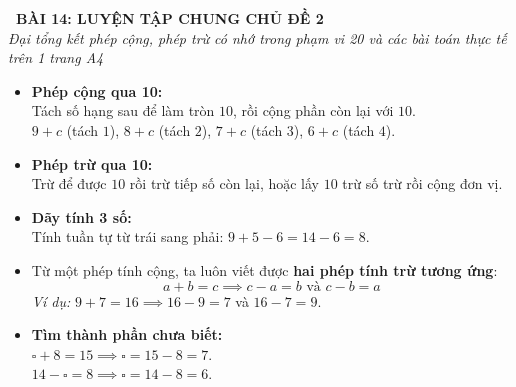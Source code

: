 \documentclass[11pt,a4paper]{article}
\begin{document}
\begin{tcolorbox}[
  enhanced,
  colback=violet!8!white,
  colframe=violet!70!black,
  arc=3mm, boxrule=1.2pt,
  left=3mm, right=3mm, top=2mm, bottom=2mm,
  halign=center
]
  {\LARGE\bfseries\color{violet!90!black}\faBookmark\ BÀI 14: LUYỆN TẬP CHUNG CHỦ ĐỀ 2}\\[1mm]
  {\itshape\footnotesize\color{black!75} Đại tổng kết phép cộng, phép trừ có nhớ trong phạm vi 20 và các bài toán thực tế trên 1 trang A4}
\end{tcolorbox}

\vspace{-2mm}

\noindent
\begin{minipage}[t]{0.49\textwidth}\vspace{0pt}
\begin{tcolorbox}[
  enhanced,
  colback=violet!4!white,
  colframe=violet!75!black,
  arc=2mm, boxrule=0.8pt,
  left=2mm, right=2mm, top=1.8mm, bottom=1.8mm,
  title={\footnotesize\bfseries\color{white}\faKey\ 1. Quy tắc tính nhẩm cốt lõi}
]
{\footnotesize
\begin{itemize}\setlength{\itemsep}{1pt}\setlength{\leftskip}{-2.5mm}
  \item \textbf{Phép cộng qua 10:}\\
  Tách số hạng sau để làm tròn $10$, rồi cộng phần còn lại với $10$.\\
  $9+c$ (tách $1$), $8+c$ (tách $2$), $7+c$ (tách $3$), $6+c$ (tách $4$).
  \item \textbf{Phép trừ qua 10:}\\
  Trừ để được $10$ rồi trừ tiếp số còn lại, hoặc lấy $10$ trừ số trừ rồi cộng đơn vị.
  \item \textbf{Dãy tính 3 số:}\\
  Tính tuần tự từ trái sang phải: $9 + 5 - 6 = 14 - 6 = 8$.
\end{itemize}
}
\end{tcolorbox}
\end{minipage}
\hfill
\begin{minipage}[t]{0.49\textwidth}\vspace{0pt}
\begin{tcolorbox}[
  enhanced,
  colback=teal!4!white,
  colframe=teal!75!black,
  arc=2mm, boxrule=0.8pt,
  left=2mm, right=2mm, top=1.8mm, bottom=1.8mm,
  title={\footnotesize\bfseries\color{white}\faSliders\ 2. Mối liên hệ Phép cộng - Phép trừ}
]
{\footnotesize
\begin{itemize}\setlength{\itemsep}{1pt}\setlength{\leftskip}{-2.5mm}
  \item Từ một phép tính cộng, ta luôn viết được \textbf{hai phép tính trừ tương ứng}:
  $$a + b = c \implies c - a = b \text{ và } c - b = a$$
  \textit{Ví dụ:} $9 + 7 = 16 \implies 16 - 9 = 7$ và $16 - 7 = 9$.
  \item \textbf{Tìm thành phần chưa biết:}\\
  $\square + 8 = 15 \implies \square = 15 - 8 = 7$.\\
  $14 - \square = 8 \implies \square = 14 - 8 = 6$.
\end{itemize}
}
\end{tcolorbox}
\end{minipage}
\end{document}
